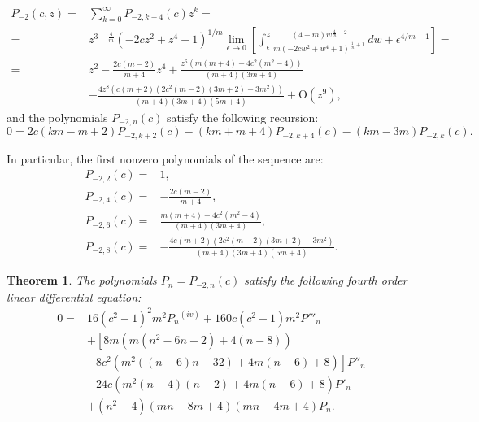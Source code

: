 \documentclass[review,nopreprintline]{elsarticle}
\newtheorem{theorem}{Theorem}[section]
\theoremstyle{definition}
\numberwithin{equation}{section}
\theoremstyle{remark}
\begin{document}
	        \begin{align*}
	            P_{-2}(c,z)=&\sum _{k=0}^{\infty }P_{-2,k-4}(c) z^{k}=
	            \\
	            =&z^{3-\frac{4}{m}} \left(-2 c z^2+z^4+1\right)^{1/m} \lim_{\epsilon\to 0}\left[\int_{\epsilon}^{z} \frac{(4-m) w^{\frac{4}{m}-2}}{m \left(-2 c w^2+w^4+1\right)^{\frac{1}{m}+1}} \, dw +\epsilon^{4/m-1}\right]= \\
	            =&z^2-\frac{2 c (m-2)}{m+4}z^4+\frac{z^6 \left(m (m+4)-4 c^2 \left(m^2-4\right)\right)}{(m+4) (3 m+4)}\\
	            &-\frac{4 z^8 \left(c (m+2) \left(2 c^2 (m-2) (3 m+2)-3 m^2\right)\right)}{(m+4) (3 m+4) (5 m+4)}+\textrm{O}(z^9),
	        \end{align*}
	        and the polynomials $P_{-2,n}(c)$ satisfy the following recursion:
	        \begin{equation}
	            0=2 c (km-m+2) P_{-2,k+2}(c)-(k m+m+4) P_{-2,k+4}(c)-(km-3m) P_{-2,k}(c).
	        \end{equation}
	        
	        In particular,
	        the first nonzero polynomials of the sequence are:
	        \begin{align*}
	            P_{-2,2}(c)=&1, \\
	            P_{-2,4}(c)=&-\frac{2 c (m-2)}{m+4}, \\
	            P_{-2,6}(c)=&\frac{m (m+4)-4 c^2 \left(m^2-4\right)}{(m+4) (3 m+4)}, \\
	            P_{-2,8}(c)=&-\frac{4 c (m+2) \left(2 c^2 (m-2) (3 m+2)-3 m^2\right)}{(m+4) (3 m+4) (5 m+4)}.
	        \end{align*}
	        \begin{theorem}
	            The polynomials $P_n=P_{-2,n}(c)$ satisfy the following fourth order linear differential equation:
	            \begin{align}\label{equacaodiferencial2}
	                0=&16 \left(c^2-1\right)^2 m^2 P_n{}^{(iv)}+160 c \left(c^2-1\right) m^2 P'''_n\nonumber\\
	                &+\left[8 m (m (n^2-6n-2)+4 (n-8))\right.\nonumber\\
	                &\left.-8 c^2 \left(m^2 ((n-6) n-32)+4 m (n-6)+8\right)\right] P''_n\nonumber\\
	                &-24 c \left(m^2 (n-4) (n-2)+4 m (n-6)+8\right) P'_n\nonumber\\
	                &+(n^2-4) (m n-8m+4) (m n-4m+4) P_n.
	            \end{align}
	        \end{theorem}
	        
\end{document}

